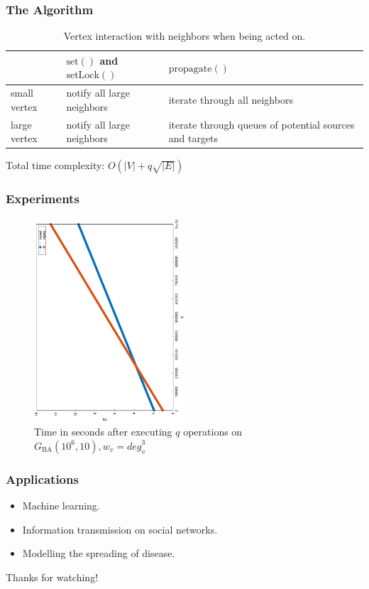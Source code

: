 \documentclass{beamer}
\begin{document}
\begin{frame}
	\frametitle{The Algorithm}
	\begin{table}
	\tiny
	\centering
	\begin{tabular}{|l|l|l|}
		\hline
					 & $ \mathrm{set}() $ and $ \mathrm{setLock}() $ & $ \mathrm{propagate}() $                                \\ \hline
		small vertex & notify all large neighbors                    & iterate through all neighbors                           \\ \hline
		large vertex & notify all large neighbors                    & iterate through queues of potential sources and targets \\ \hline
	\end{tabular}
	\caption{Vertex interaction with neighbors when being acted on.}
	\end{table}

	\begin{center}
	Total time complexity: $ O\left(\lvert V \rvert + q \sqrt{\lvert E \rvert} \right) $
	\end{center}
\end{frame}

\begin{frame}
	\frametitle{Experiments}
	\begin{figure}
		\centering
		\includegraphics[width=0.5\textwidth,angle=-90]{../paper/graph/ba_q_1000000_10_0.1_power_3.eps}
		\caption{Time in seconds after executing $ q $ operations on $ G_\mathrm{BA}(10^6, 10), w_v = \mathit{deg}_v^3 $}
	\end{figure}
\end{frame}

\begin{frame}
	\frametitle{Applications}
	\begin{itemize}
		\item Machine learning.
		\item Information transmission on social networks.
		\item Modelling the spreading of disease.
	\end{itemize}
\end{frame}

\begin{frame}
	\begin{center}
	{\Huge Thanks for watching!}
	\end{center}
\end{frame}
\end{document}
